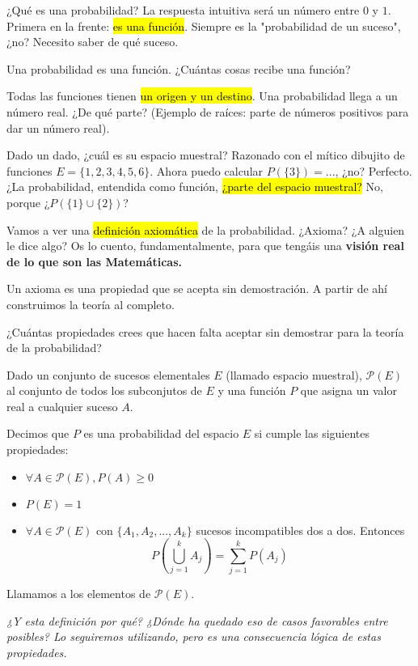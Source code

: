 {¿Qu\'e es una probabilidad? La respuesta intuitiva será un número entre $0$ y $1$. Primera en la frente: \hl{es una función}. Siempre es la "probabilidad de un suceso", ¿no? Necesito saber de qué suceso. 

Una probabilidad es una función. ¿Cuántas cosas recibe una función?

Todas las funciones tienen \hl{un origen y un destino}. Una probabilidad llega a un número real. ¿De qué parte? (Ejemplo de raíces: parte de números positivos para dar un número real).

Dado un dado, ¿cuál es su espacio muestral? Razonado con el mítico dibujito de funciones 
$E=\{1,2,3,4,5,6\}$. Ahora puedo calcular $P(\{3\}) = ...$, ¿no? Perfecto. ¿La probabilidad, entendida como función, \hl{¿parte del espacio muestral?} No, porque ¿$P(\{1\}\cup\{2\})$? 

Vamos a ver una \hl{definición axiomática} de la probabilidad. ¿Axioma? ¿A alguien le dice algo? Os lo cuento, fundamentalmente, para que tengáis una \textbf{visi\'on real de lo que son las Matemáticas.}}

Un axioma es una propiedad que se acepta sin demostración. A partir de ahí construimos la teoría al completo.

{¿Cuántas propiedades crees que hacen falta aceptar sin demostrar para la teoría de la probabilidad?}


\begin{defn}
Dado un conjunto de sucesos elementales $E$ (llamado espacio muestral), $\mathcal{P}(E)$ al conjunto de todos los subconjutos de $E$ y una función $P$ que asigna un valor real a cualquier suceso $A$.

Decimos que $P$ es una probabilidad del espacio $E$ si cumple las siguientes propiedades:

\begin{itemize}
	\item $\forall A\in \mathcal{P}(E), P(A)\geq 0$
	\item $P(E) = 1$
	\item $\forall A\in \mathcal{P}(E)$ con $\{A_1,A_2,..., A_k\}$ sucesos incompatibles dos a dos. Entonces \[ P\left(\bigcup_{j=1}^k A_j\right) = \sum_{j=1}^k P(A_j) \]
\end{itemize}

\obs Llamamos  a los elementos de $\mathcal{P}(E)$.

\end{defn}

\textit{¿Y esta definición por qué? ¿Dónde ha quedado eso de casos favorables entre posibles? Lo seguiremos utilizando, pero es una consecuencia lógica de estas propiedades.}

